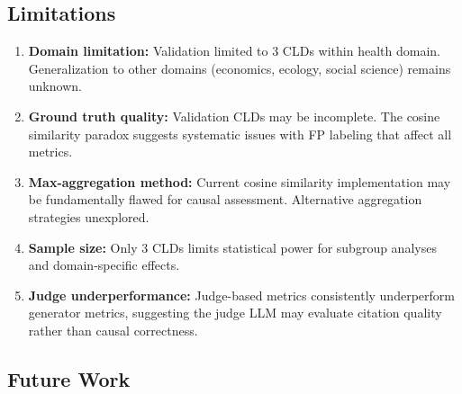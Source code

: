 \subsection{Limitations}

\begin{enumerate}
    \item \textbf{Domain limitation:} Validation limited to 3 CLDs within health domain. Generalization to other domains (economics, ecology, social science) remains unknown.
    
    \item \textbf{Ground truth quality:} Validation CLDs may be incomplete. The cosine similarity paradox suggests systematic issues with FP labeling that affect all metrics.
    
    \item \textbf{Max-aggregation method:} Current cosine similarity implementation may be fundamentally flawed for causal assessment. Alternative aggregation strategies unexplored.
    
    \item \textbf{Sample size:} Only 3 CLDs limits statistical power for subgroup analyses and domain-specific effects.
    
    \item \textbf{Judge underperformance:} Judge-based metrics consistently underperform generator metrics, suggesting the judge LLM may evaluate citation quality rather than causal correctness.
\end{enumerate}

\subsection{Future Work}

